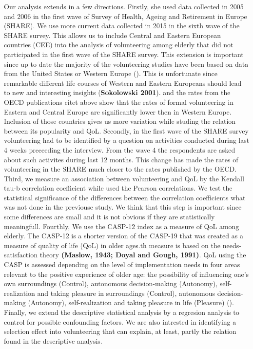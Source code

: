 \documentclass[10pt, letterpaper]{article}
\begin{document}
\begin{spacing}{1.4}
Our analysis extends \citet{haski09} in a few directions. Firstly, she used data collected in 2005 and 2006 in the first wave of Survey of Health, Ageing and Retirement in Europe (SHARE). We use more current data collected in 2015 in the sixth wave of the SHARE survey. This allows us to include Central and Eastern European countries (CEE) into the analysis of volunteering among elderly that did not participated in the first wave of the SHARE survey. This extension is important since up to date the majority of the volunteering studies have been based on data from the United States or Western Europe (\citep{casiday08}). This is unfortunate since remarkable different life courses of Western and Eastern Europeans should lead to new and interesting insights (\textbf{Sokolowski 2001}). \citet{plagnol10} and the rates from the OECD publications citet above show that the rates of formal volunteering in Eastern and Central Europe are significantly lower then in Western Europe. Inclusion of those countries gives us more variation while studing the relation between its popularity and QoL. Secondly, in the first wave of the SHARE survey volunteering had to be identified by a question on activities conducted during last 4 weeks preceeding the interview. From the wave 4 the respondents are asked about such activites during last 12 months. This change has made the rates of volunteering in the SHARE much closer to the rates published by the OECD. Third, we measure an association between volunteering and QoL by the Kendall tau-b correlation coefficient while \citet{haski09} used the Pearson correlations. We test the statistical significance of the differences between the correlation coefficients what was not done in the previouse study. We think that this step is important since some differences are small and it is not obvious if they are statistically meaningfull. Fourthly, We use the CASP-12 index as a measure of QoL among elderly. The CASP-12 is a shorter version of the CASP-19 that was created as a measure of quality of life (QoL) in older ages.th measure is based on the needs-satisfaction theory \textbf{(Maslow, 1943; Doyal and Gough, 1991)}. QoL using the CASP is assessed depending on the level of implementation needs in four areas relevant to the positive experience of older age: the possibility of influencing one's own  surroundings (Control), autonomous decision-making (Autonomy), self-realization and taking pleasure in	surroundings (Control), autonomous decision-making (Autonomy), self-realization and taking pleasure in  life (Pleasure) (\cite{hyde03}). Finally, we extend the descriptive statistical analysis by a regresion analysis to control for possible confounding factors. We are also intrested in identifying a selection effect into volunteering that can explain, at least, partly the relation found in the descriptive analysis.  


\end{spacing}
\end{document}
